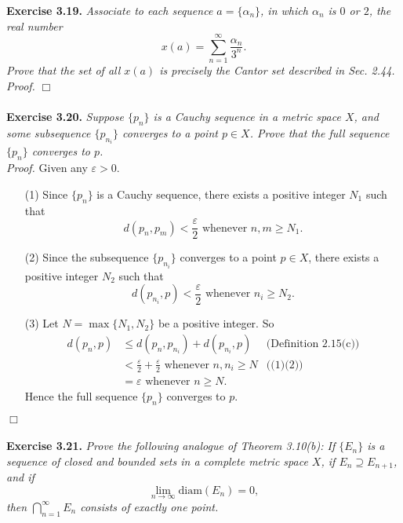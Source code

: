 \documentclass{article}
\begin{document}
\textbf{Exercise 3.19.}
\emph{Associate to each sequence $a = \{\alpha_n\}$,
in which $\alpha_n$ is $0$ or $2$, the real number
$$x(a) = \sum_{n=1}^{\infty} \frac{\alpha_n}{3^n}.$$
Prove that the set of all $x(a)$ is precisely the Cantor set described in Sec. 2.44.} \\

\emph{Proof.}
$\Box$ \\\\






\textbf{Exercise 3.20.}
\emph{Suppose $\{p_n\}$ is a Cauchy sequence in a metric space $X$,
and some subsequence $\{p_{n_i}\}$ converges to a point $p \in X$.
Prove that the full sequence $\{p_n\}$ converges to $p$. } \\

\emph{Proof.}
Given any $\varepsilon > 0$.
\begin{enumerate}
\item[(1)]
Since $\{p_n\}$ is a Cauchy sequence, there exists a positive integer $N_1$ such that
$$d(p_n,p_m) < \frac{\varepsilon}{2} \text{ whenever } n, m \geq N_1.$$
\item[(2)]
Since the subsequence $\{p_{n_i}\}$ converges to a point $p \in X$,
there exists a positive integer $N_2$ such that
$$d(p_{n_i},p) < \frac{\varepsilon}{2} \text{ whenever } n_i \geq N_2.$$
\item[(3)]
Let $N = \max\{N_1, N_2\}$ be a positive integer.
So
\begin{align*}
d(p_n,p)
&\leq d(p_n,p_{n_i}) + d(p_{n_i}, p)
  &\text{(Definition 2.15(c))} \\
&< \frac{\varepsilon}{2} + \frac{\varepsilon}{2} \text{ whenever } n, n_i \geq N
  &\text{((1)(2))} \\
&= \varepsilon \text{ whenever } n \geq N.
\end{align*}
Hence the full sequence $\{p_n\}$ converges to $p$.
\end{enumerate}
$\Box$ \\\\






\textbf{Exercise 3.21.}
\emph{Prove the following analogue of Theorem 3.10(b):
If $\{E_n\}$ is a sequence of closed and bounded sets in a complete metric space $X$,
if $E_n \supseteq E_{n+1}$, and if
$$\lim_{n \to \infty} \mathrm{diam}(E_n) = 0,$$
then $\bigcap_{n=1}^{\infty} E_n$ consists of exactly one point.} \\
\end{document}
